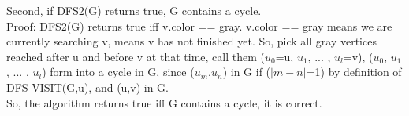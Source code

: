 \documentclass{article}
\begin{document}
Second, if DFS2(G) returns true, G contains a cycle.\\
Proof: DFS2(G) returns true iff v.color == gray. v.color == gray means we are currently searching v, means v has not finished yet. So, pick all gray vertices reached after u and before v at that time, call them ($u_0$=u, $u_1$, ... , $u_l$=v), ($u_0$, $u_1$, ... , $u_l$) form into a cycle in G, since ($u_m$,$u_n$) in G if ($|m-n|$=1) by definition of DFS-VISIT(G,u), and (u,v) in G.\\
So, the algorithm returns true iff G contains a cycle, it is correct.
\end{document}
